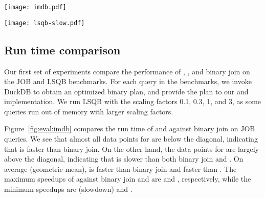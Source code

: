 \begin{figure*}
  \centering
  \begin{minipage}[t]{.45\textwidth}
    \centering
    \texttt{[image: imdb.pdf]}
    \label{fig:eval:imdb}
  \end{minipage}%
  \hspace{1em}
  \begin{minipage}[t]{.45\textwidth}
    \centering
    \texttt{[image: lsqb-slow.pdf]}
    \label{fig:eval:lsqb}
  \end{minipage}
  \end{figure*}


\subsection{Run time comparison}\label{sec:run-time-comparison}
Our first set of experiments compare the performance of \FJ, \GJ, and binary join
  on the JOB and LSQB benchmarks.
For each query in the benchmarks, we invoke DuckDB to obtain an optimized binary plan,
  and provide the plan to our \FJ and \GJ implementation.
We run LSQB with the scaling factors 0.1, 0.3, 1, and 3, 
  as some queries run out of memory with larger scaling factors.

Figure~\ref{fig:eval:imdb} compares the run time of \FJ and \GJ against binary join on JOB queries.
We see that almost all data points for \FJ are below the diagonal, 
  indicating that \FJ is faster than binary join.
On the other hand, the data points for \GJ are largely above the diagonal, 
  indicating that \GJ is slower than both binary join and \FJ.
On average (geometric mean), \FJ is \imdbavgfjbj faster than binary join 
  and \imdbavgfjgj faster than \GJ.
The maximum speedups of \FJ against binary join and \GJ 
  are \imdbmaxfjbj and \imdbmaxfjgj, respectively, 
  while the minimum speedups are \imdbminfjbj (\imdbmaxbjfj slowdown) and \imdbminfjgj.

